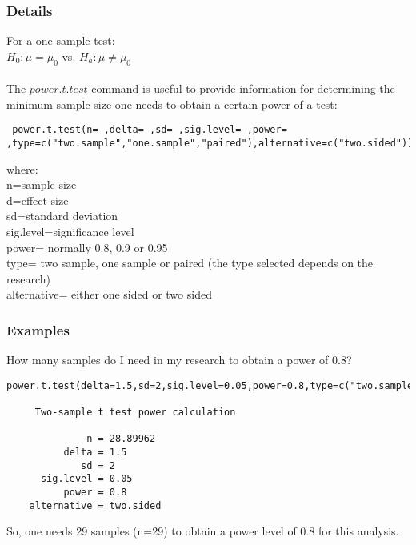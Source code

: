 \documentclass[12pt,a4paper]{article}
\theoremstyle{regla}
\theoremstyle{remark}
\theoremstyle{definition}
\theoremstyle{nonumberbreak}
\begin{document}
\subsubsection{Details}
For a one sample test:\\
$H_0: \mu=\mu_0$ vs. $H_a:\mu\neq\mu_0$\\
\\
The $power.t.test$ command is useful to provide information for determining the minimum sample size one needs to obtain a certain power of a test:
\begin{lstlisting}
 power.t.test(n= ,delta= ,sd= ,sig.level= ,power= ,type=c("two.sample","one.sample","paired"),alternative=c("two.sided"))
\end{lstlisting}
where:\\
n=sample size\\
d=effect size\\
sd=standard deviation\\
sig.level=significance level\\
power= normally 0.8, 0.9 or 0.95 \\
type= two sample, one sample or paired (the type selected depends on the research)\\
alternative= either one sided or two sided\\
\subsubsection{Examples}
\begin{xmpl}
How many samples do I need in my research to obtain a power of 0.8?\\
\begin{lstlisting}
power.t.test(delta=1.5,sd=2,sig.level=0.05,power=0.8,type=c("two.sample"),alternative=c("two.sided"))

     Two-sample t test power calculation 

              n = 28.89962
          delta = 1.5
             sd = 2
      sig.level = 0.05
          power = 0.8
    alternative = two.sided

\end{lstlisting}
So, one needs 29 samples (n=29) to obtain a power level of 0.8 for this analysis.
\end{xmpl}

\end{document}
